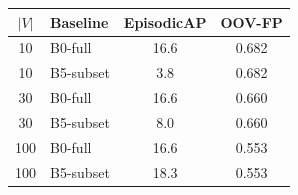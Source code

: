 \begin{tabular}{c l cc}
\toprule
$|V|$ & Baseline & EpisodicAP & OOV-FP \\
\midrule
10 & B0-full & 16.6 & 0.682 \\
10 & B5-subset & 3.8 & 0.682 \\
30 & B0-full & 16.6 & 0.660 \\
30 & B5-subset & 8.0 & 0.660 \\
100 & B0-full & 16.6 & 0.553 \\
100 & B5-subset & 18.3 & 0.553 \\
\bottomrule
\end{tabular}
